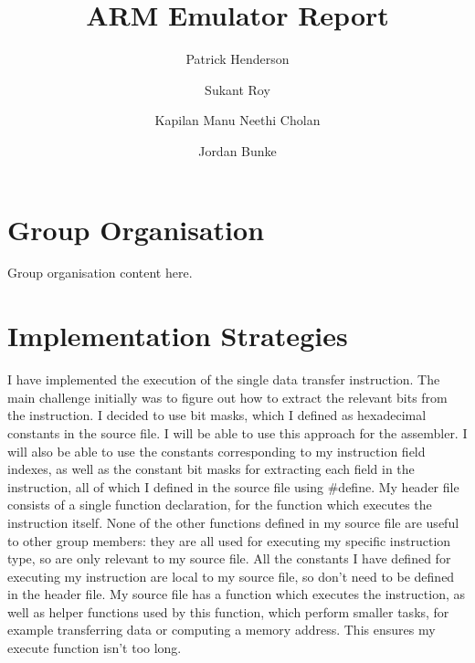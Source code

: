 \documentclass[11pt]{article}
\begin{document}
\title{ARM Emulator Report}
\author{
    Patrick Henderson\\
    \and
    Sukant Roy\\
    \and
  	Kapilan Manu Neethi Cholan\\
  	\and
  	Jordan Bunke
}

\maketitle

\section{Group Organisation}

	Group organisation content here.

\section{Implementation Strategies}
    I have implemented the execution of the single data transfer instruction. The
    main challenge initially was to figure out how to extract the relevant bits from
    the instruction. I decided to use bit masks, which I defined as hexadecimal
    constants in the source file. I will be able to use this approach for the assembler.
    I will also be able to use the constants corresponding to my instruction field
    indexes, as well as the constant bit masks for extracting each field in the
    instruction, all of which I defined in the source file using #define. My header
    file consists of a single function declaration, for the function which executes
    the instruction itself. None of the other functions defined in my source file
    are useful to other group members: they are all used for executing my specific
    instruction type, so are only relevant to my source file. All the constants I
    have defined for executing my instruction are local to my source file, so don't
    need to be defined in the header file. My source file has a function which
    executes the instruction, as well as helper functions used by this function,
    which perform smaller tasks, for example transferring data or computing a memory
    address. This ensures my execute function isn't too long.
\end{document}
